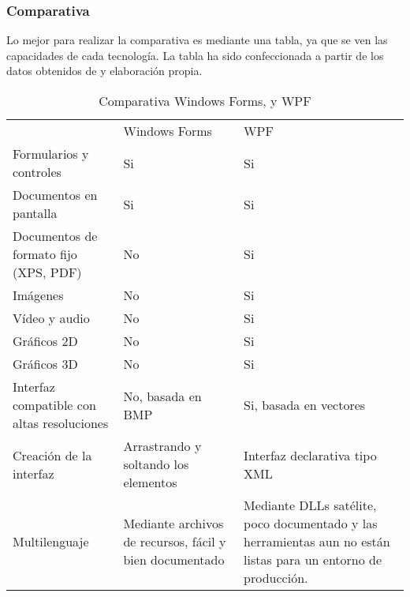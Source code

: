 \subsubsection{Comparativa}
Lo mejor para realizar la comparativa es mediante una tabla, ya que se ven las capacidades de cada tecnolog\'{i}a.
La tabla ha sido confeccionada a partir de los datos obtenidos de \cite{WPFvsWinForms:Comparative} y elaboraci\'{o}n propia.

\begin{table}[H]
    \begin{center}
        \begin{tabular}{|p{5cm} | p{4cm} | p{4cm}|}
            \rowcolor{darkgray}                         & \color{white}Windows Forms               & \color{white}WPF \\
            Formularios y controles                     & Si                                       & Si \\
            Documentos en pantalla                      & Si                                       & Si \\
            Documentos de formato fijo (XPS, PDF)       & No                                       & Si \\
            Im\'{a}genes                                & No                                       & Si \\
            V\'{i}deo y audio                           & No                                       & Si \\
            Gr\'{a}ficos 2D                             & No                                       & Si \\
            Gr\'{a}ficos 3D                             & No                                       & Si \\
            Interfaz compatible con altas resoluciones  & No, basada en BMP                        & Si, basada en vectores \\
            Creaci\'{o}n de la interfaz                 & Arrastrando y soltando los elementos     & Interfaz declarativa tipo XML \\
            Multilenguaje                               & Mediante archivos de recursos, f\'{a}cil y bien documentado & Mediante DLLs sat\'{e}lite, poco documentado y las herramientas aun no est\'{a}n listas para un entorno de producci\'{o}n. \\
            \hline
        \end{tabular}
    \end{center}
    \caption[Comparativa]{Comparativa Windows Forms, y WPF}
    \label{ComparativaWPF}
\end{table}

